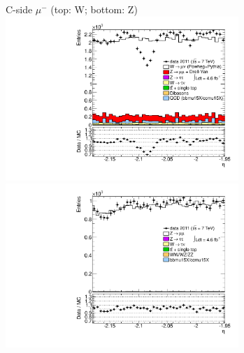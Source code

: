 {{\cole
}



 {
\colb[T]

C-side $\mu^{-}$ (top: W; bottom: Z)
\centering
\includegraphics[width=0.66\textwidth]{dates/20130306/figures/etaphi/WpLtoL_10_C_stack_l_eta_NEG} \\
\includegraphics[width=0.66\textwidth]{dates/20130306/figures/etaphi/Z_10_C_stack_lN_eta_ALL.pdf}

}}
